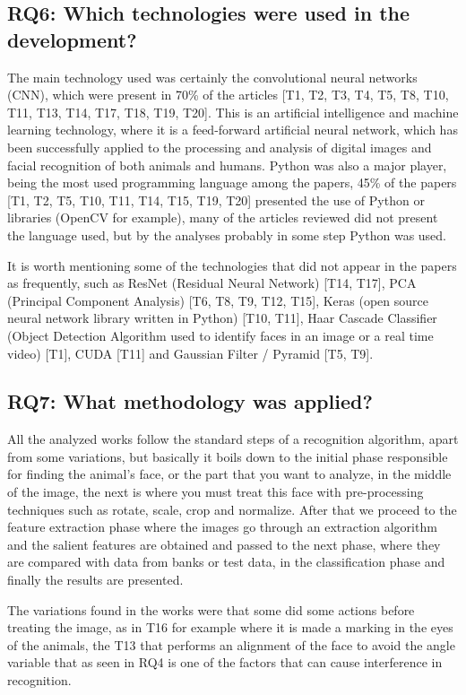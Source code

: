 \documentclass[alpha-refs,english]{RBCA_v3.0}
\begin{document}
\subsection{RQ6: Which technologies were used in the development?}
The main technology used was certainly the convolutional neural networks (CNN), which were present in 70\% of the articles [T1, T2, T3, T4, T5, T8, T10, T11, T13, T14, T17, T18, T19, T20]. This is an artificial intelligence and machine learning technology, where it is a feed-forward artificial neural network, which has been successfully applied to the processing and analysis of digital images and facial recognition of both animals and humans. 
Python was also a major player, being the most used programming language among the papers, 45\% of the papers [T1, T2, T5, T10, T11, T14, T15, T19, T20] presented the use of Python or libraries (OpenCV for example), many of the articles reviewed did not present the language used, but by the analyses probably in some step Python was used.

It is worth mentioning some of the technologies that did not appear in the papers as frequently, such as ResNet (Residual Neural Network) [T14, T17], PCA (Principal Component Analysis) [T6, T8, T9, T12, T15], Keras (open source neural network library written in Python) [T10, T11], Haar Cascade Classifier (Object Detection Algorithm used to identify faces in an image or a real time video) [T1], CUDA [T11] and Gaussian Filter / Pyramid [T5, T9].

\subsection{RQ7: What methodology was applied?}
All the analyzed works follow the standard steps of a recognition algorithm, apart from some variations, but basically it boils down to the initial phase responsible for finding the animal's face, or the part that you want to analyze, in the middle of the image, the next is where you must treat this face with pre-processing techniques such as rotate, scale, crop and normalize. After that we proceed to the feature extraction phase where the images go through an extraction algorithm and the salient features are obtained and passed to the next phase, where they are compared with data from banks or test data, in the classification phase and finally the results are presented. 

The variations found in the works were that some did some actions before treating the image, as in T16 for example where it is made a marking in the eyes of the animals, the T13 that performs an alignment of the face to avoid the angle variable that as seen in RQ4 is one of the factors that can cause interference in recognition.
\end{document}
